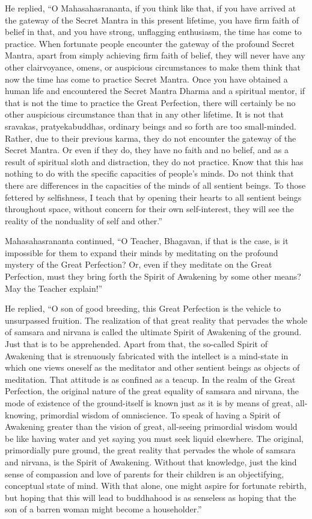 \documentclass[a4paper,11pt,twoside,final]{book}
\begin{document}
He replied, ``O Mahasahasrananta, if you think like that, if you have
arrived at the gateway of the Secret Mantra in this present lifetime,
you have firm faith of belief in that, and you have strong, unflagging
enthusiasm, the time has come to practice. When fortunate people
encounter the gateway of the profound Secret Mantra, apart from simply
achieving firm faith of belief, they will never have any other
clairvoyance, omens, or auspicious circumstances to make them think
that now the time has come to practice Secret Mantra. Once you have
obtained a human life and encountered the Secret Mantra Dharma and a
spiritual mentor, if that is not the time to practice the Great
Perfection, there will certainly be no other auspicious circumstance
than that in any other lifetime. It is not that sravakas,
pratyekabuddhas, ordinary beings and so forth are too
small-minded. Rather, due to their previous karma, they do not
encounter the gateway of the Secret Mantra. Or even if they do, they
have no faith and no belief, and as a result of spiritual sloth and
distraction, they do not practice.  Know that this has nothing to do
with the specific capacities of people's minds. Do not think that
there are differences in the capacities of the minds of all sentient
beings. To those fettered by selfishness, I teach that by opening
their hearts to all sentient beings throughout space, without concern
for their own self-interest, they will see the reality of the
nonduality of self and other.''

Mahasahasrananta continued, ``O Teacher, Bhagavan, if that is the
case, is it impossible for them to expand their minds by meditating on
the profound mystery of the Great Perfection? Or, even if they
meditate on the Great Perfection, must they bring forth the Spirit of
Awakening by some other means? May the Teacher explain!''

He replied, ``O son of good breeding, this Great Perfection is the
vehicle to unsurpassed fruition. The realization of that great reality
that pervades the whole of samsara and nirvana is called the ultimate
Spirit of Awakening of the ground. Just that is to be
apprehended. Apart from that, the so-called Spirit of Awakening that
is strenuously fabricated with the intellect is a mind-state in which
one views oneself as the meditator and other sentient beings as
objects of meditation. That attitude is as confined as a teacup. In
the realm of the Great Perfection, the original nature of the great
equality of samsara and nirvana, the mode of existence of the
ground-itself is known just as it is by means of great, all-knowing,
primordial wisdom of omniscience. To speak of having a Spirit of
Awakening greater than the vision of great, all-seeing primordial
wisdom would be like having water and yet saying you must seek liquid
elsewhere. The original, primordially pure ground, the great reality
that pervades the whole of samsara and nirvana, is the Spirit of
Awakening. Without that knowledge, just the kind sense of compassion
and love of parents for their children is an objectifying, conceptual
state of mind.  With that alone, one might aspire for fortunate
rebirth, but hoping that this will lead to buddhahood is as senseless
as hoping that the son of a barren woman might become a householder.''
\end{document}

